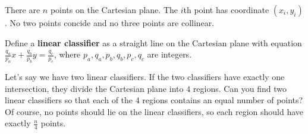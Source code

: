 There are $n$ points on the Cartesian plane.
The $i$th point has coordinate $(x_i,y_i)$.
No two points concide and no three points are collinear.

Define a \textbf{linear classifier} as a straight line on the Cartesian plane with equation $\frac{q_a}{p_a} x + \frac{q_b}{p_b} y = \frac{q_c}{p_c}$, where $p_a,q_a,p_b,q_b,p_c,q_c$ are integers. 

Let's say we have two linear classifiers.
If the two classifiers have exactly one intersection, they divide the Cartesian plane into $4$ regions.
Can you find two linear classifiers so that each of the $4$ regions contains an equal number of points?
Of course, no points should lie on the linear classifiers, so each region should have exactly $\frac{n}{4}$ points. 
